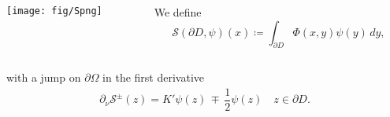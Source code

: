 \documentclass[10pt]{beamer}
\theoremstyle{plain}
\theoremstyle{plain}
\begin{document}
\begin{frame}
\begin{columns}[T]
  \begin{column}{0.50\textwidth}
  \texttt{[image: fig/Spng]}
  \end{column}
  \begin{column}{0.50\textwidth}
  \vspace{2cm}
  We define
   \begin{equation*}
    \mathcal{S}(\partial D,\psi)(x)\coloneqq \int_{\partial D} \Phi(x, y)\psi(y)\, dy,
    \label{eq:definition-single-layer}
   \end{equation*}
  \end{column}
 \end{columns}
 \vspace{0.1cm}
   with a jump on $\partial\Omega$ in the first derivative
  \begin{align*}
   \partial_\nu\mathcal{S}^\pm(z) =  K'\psi(z) \,\mp\,\dfrac{1}{2}\psi(z) \quad z\in\partial D.\label{eq:single-pm-1}
  \end{align*}

 \end{frame}
\end{document}
